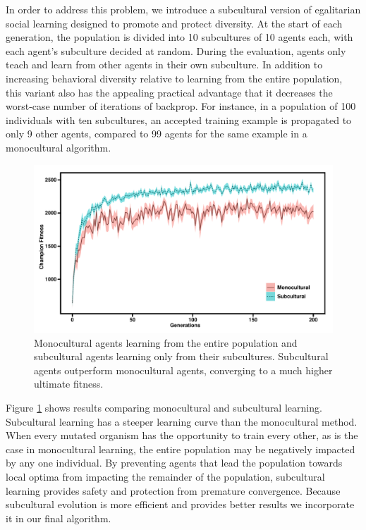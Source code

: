 \documentclass{sig-alternate}
\begin{document}
In order to address this problem, we introduce a subcultural version of egalitarian social learning designed to promote and protect diversity. At the start of each generation, the population is divided into 10 subcultures of 10 agents each, with each agent's subculture decided at random. During the evaluation, agents only teach and learn from other agents in their own subculture. In addition to increasing behavioral diversity relative to learning from the entire population, this variant also has the appealing practical advantage that it decreases the worst-case number of iterations of backprop. For instance, in a population of 100 individuals with ten subcultures, an accepted training example is propagated to only 9 other agents, compared to 99 agents for the same example in a monocultural algorithm.

\begin{figure}
  \centering
    \includegraphics[scale=.42]{monocultural_vs_subcultural_learning.pdf}
  \caption{Monocultural agents learning from the entire population and subcultural agents learning only from their subcultures.  Subcultural agents outperform monocultural agents, converging to a much higher ultimate fitness.}
  \label{fig:population-social}
\end{figure}

Figure \ref{fig:population-social} shows results comparing monocultural and subcultural learning. Subcultural learning has a steeper learning curve than the monocultural method. When every mutated organism has the opportunity to train every other, as is the case in monocultural learning, the entire population may be negatively impacted by any one individual. By preventing agents that lead the population towards local optima from impacting the remainder of the population, subcultural learning provides safety and protection from premature convergence.  Because subcultural evolution is more efficient and provides better results we incorporate it in our final algorithm.
\end{document}
